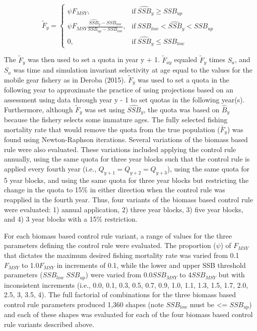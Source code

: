 \documentclass[]{article}
\begin{document}
\begin{equation}
  \label{Fy_equation}
    \tilde{F}_y=
    \begin{cases}
      \psi F_{MSY}, & \text{if}\ \widehat{SSB}_y \geq SSB_{up} \\
      \psi F_{MSY} \frac{\widehat{SSB}_y - SSB_{low}}{SSB_{up}-SSB_{low}}, & \text{if}\ SSB_{low} < \widehat{SSB}_y < SSB_{up}\\
      0, & \text{if}\ \widehat{SSB}_y \leq SSB_{low}
    \end{cases}
  \end{equation}

The \(\tilde{F}_y\) was then used to set a quota in year y + 1.
\(\tilde{F}_{ay}\) equaled \(\tilde{F}_y\) times \(S_a\), and \(S_a\)
was time and simulation invariant selectivity at age equal to the values
for the mobile gear fishery as in Deroba (2015). \(\tilde{F}_y\) was
used to set a quota in the following year to approximate the practice of
using projections based on an assessment using data through year y - 1
to set quotas in the following year(s). Furthermore, although
\(\tilde{F}_y\) was set using \(\widehat{SSB}_y\), the quota was based
on \(\widehat{B}_y\) because the fishery selects some immature ages. The
fully selected fishing mortality rate that would remove the quota from
the true population (\(\bar{F}_y\)) was found using Newton-Raphson
iterations. Several variations of the biomass based rule were also
evaluated. These variations included applying the control rule annually,
using the same quota for three year blocks such that the control rule is
applied every fourth year (i.e., \(Q_{y+1}=Q_{y+2}=Q_{y+3}\)), using the
same quota for 5 year blocks, and using the same quota for three year
blocks but restricting the change in the quota to 15\% in either
direction when the control rule was reapplied in the fourth year. Thus,
four variants of the biomass based control rule were evaluated: 1)
annual application, 2) three year blocks, 3) five year blocks, and 4) 3
year blocks with a 15\% restriction.

For each biomass based control rule variant, a range of values for the
three parameters defining the control rule were evaluated. The
proportion (\(\psi\)) of \(F_{MSY}\) that dictates the maximum desired
fishing mortality rate was varied from 0.1\(F_{MSY}\) to 1.0\(F_{MSY}\)
in increments of 0.1, while the lower and upper SSB threshold parameters
(\(SSB_{low} \; SSB_{up}\)) were varied from 0.0\(SSB_{MSY}\) to
4\(SSB_{MSY}\) but with inconsistent increments (i.e., 0.0, 0.1, 0.3,
0.5, 0.7, 0.9, 1.0, 1.1, 1.3, 1.5, 1.7, 2.0, 2.5, 3, 3.5, 4). The full
factorial of combinations for the three biomass based control rule
parameters produced 1,360 shapes (note \(SSB_{low}\) must be
\textless{}= \(SSB_{up}\)) and each of these shapes was evaluated for
each of the four biomass based control rule variants described above.
\end{document}
